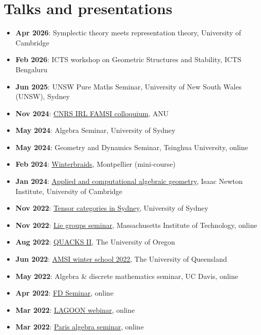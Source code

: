 \documentclass[a4paper]{moderncv}
\begin{document}
\section*{Talks and presentations}
\label{sec:orgdb0df69}
\begin{itemize}
\item \textbf{Apr 2026}: Symplectic theory meets representation theory, University of Cambridge
\item \textbf{Feb 2026}: ICTS workshop on Geometric Structures and Stability, ICTS Bengaluru
\item \textbf{Jun 2025}: UNSW Pure Maths Seminar, University of New South Wales (UNSW), Sydney
\item \textbf{Nov 2024}: \href{https://maths.anu.edu.au/news-events/events/cnrs-irl-famsi-research-talks}{CNRS IRL FAMSI colloquium}, ANU
\item \textbf{May 2024}: Algebra Seminar, University of Sydney
\item \textbf{May 2024}: Geometry and Dynamics Seminar, Tsinghua University, online
\item \textbf{Feb 2024}: \href{https://winterbraids-xiii.sciencesconf.org/}{Winterbraids}, Montpellier (mini-course)
\item \textbf{Jan 2024}: \href{https://www.newton.ac.uk/event/emgw02/}{Applied and computational algebraic geometry}, Isaac Newton Institute, University of Cambridge
\item \textbf{Nov 2022}: \href{https://www.maths.usyd.edu.au/u/kevinc/TensorCat.html}{Tensor categories in Sydney}, University of Sydney
\item \textbf{Nov 2022}: \href{https://math.mit.edu/lg/}{Lie groups seminar}, Massachusetts Institute of Technology, online
\item \textbf{Aug 2022}: \href{https://pages.uoregon.edu/belias/QUACKSII/index.html}{QUACKS II}, The University of Oregon
\item \textbf{Jun 2022}: \href{https://ws.amsi.org.au/}{AMSI winter school 2022}, The University of Queensland
\item \textbf{May 2022}: Algebra \& discrete mathematics seminar, UC Davis, online
\item \textbf{Apr 2022}: \href{https://www.fd-seminar.xyz/}{FD Seminar}, online
\item \textbf{Mar 2022}: \href{https://sites.google.com/view/lagoonwebinar/home}{LAGOON webinar}, online
\item \textbf{Mar 2022}: \href{https://www.imj-prg.fr/gestion/evenement/affEvenement/1}{Paris algebra seminar}, online

\end{itemize}
\end{document}
